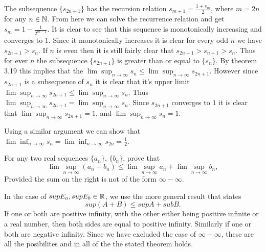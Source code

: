 \begin{solution}
  The subsequence $\{s_{2n + 1}\}$ has the recursion relation $s_{m + 1} = \frac{1 + s_m}{2}$, where $m = 2n$ for any $n \in \mathbb{N}$.
  From here we can solve the recurrence relation and get $s_{m} = 1 - \frac{1}{2^{m - 1}}$.
  It is clear to see that this sequence is monotonically increasing and converges to $1$.
  Since it monotonically increases it is clear for every odd $n$ we have $s_{2n + 1} > s_n$.
  If $n$ is even then it is still fairly clear that $s_{2n + 1} > s_{n + 1} > s_{n}$.
  Thus for ever $n$ the subsequence $\{s_{2n + 1}\}$ is greater than or equal to $\{s_n\}$.
  By theorem 3.19 this implies that the $\lim\sup_{n \to \infty} s_n \le \lim\sup_{n \to \infty} s_{2n + 1}$.
  However since $s_{2n + 1}$ is a subsequence of $s_n$ it is clear that it's upper limit $\lim\sup_{n \to \infty} s_{2n + 1} \le \lim\sup_{n \to \infty} s_{n}$.
  Thus $\lim\sup_{n \to \infty} s_{2n + 1} = \lim\sup_{n \to \infty} s_{n}$.
  Since $s_{2n + 1}$ converges to $1$ it is clear that $\lim\sup_{n \to \infty} s_{2n + 1} = 1$, and $\lim\sup_{n \to \infty} s_{n} = 1$.

  Using a similar argument we can show that $\lim\inf_{n \to \infty} s_{n} = \lim\inf_{n \to \infty} s_{2n} = \frac{1}{2}$.
\end{solution}

\begin{problem}
  For any two real sequences $\{a_n\}$, $\{b_n\}$, prove that
  \[\lim\sup_{n \to \infty} (a_n + b_n) \le \lim\sup_{n \to \infty} a_n + \lim\sup_{n \to \infty} b_n,\]
  Provided the sum on the right is not of the form $\infty - \infty$.
\end{problem}

\begin{solution}
  In the case of $sup E_a, sup E_b \in \mathbb{R}$, we use the more general result that states
  \[sup(A + B) \le sup A + sub B.\]
  If one or both are positive infinity, with the other either being positive infinite or a real number, then both sides are equal to positive infinity.
  Similarly if one or both are negative infinity.
  Since we have excluded the case of $\infty - \infty$, these are all the posibilites and in all of the the stated theorem holds.
\end{solution}

